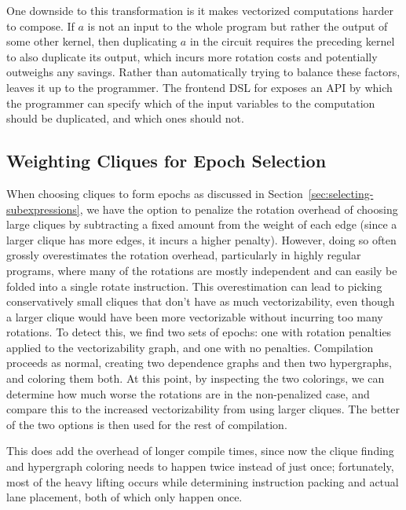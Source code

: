 One downside to this transformation is it makes vectorized computations harder to compose.
If $a$ is not an input to the whole program but rather the output of some other kernel, then duplicating $a$ in the circuit requires the preceding kernel to also duplicate its output, which incurs more rotation costs and potentially outweighs any savings.
Rather than automatically trying to balance these factors, \system leaves it up to the programmer.
The frontend DSL for \system exposes an API by which the programmer can specify which of the input variables to the computation should be duplicated, and which ones should not.


\subsection{Weighting Cliques for Epoch Selection}\label{sec:penalizing-rotates}%
When choosing cliques to form epochs as discussed in Section~\ref{sec:selecting-subexpressions}, we have the option to penalize the rotation overhead of choosing large cliques by subtracting a fixed amount from the weight of each edge (since a larger clique has more edges, it incurs a higher penalty).
However, doing so often grossly overestimates the rotation overhead, particularly in highly regular programs, where many of the rotations are mostly independent and can easily be folded into a single rotate instruction.
This overestimation can lead to picking conservatively small cliques that don't have as much vectorizability, even though a larger clique would have been more vectorizable without incurring too many rotations.
To detect this, we find two sets of epochs: one with rotation penalties applied to the vectorizability graph, and one with no penalties.
Compilation proceeds as normal, creating two dependence graphs and then two hypergraphs, and coloring them both.
At this point, by inspecting the two colorings, we can determine how much worse the rotations are in the non-penalized case, and compare this to the increased vectorizability from using larger cliques.
The better of the two options is then used for the rest of compilation.

This does add the overhead of longer compile times, since now the clique finding and hypergraph coloring needs to happen twice instead of just once; fortunately, most of the heavy lifting occurs while determining instruction packing and actual lane placement, both of which only happen once.
